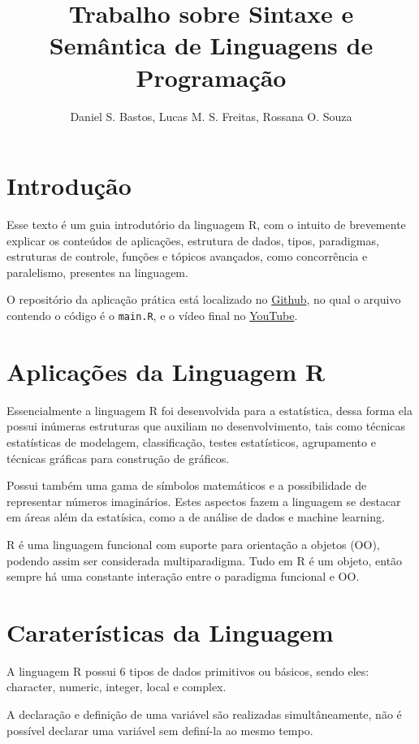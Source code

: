 \documentclass[12pt]{article}
\title{Trabalho sobre Sintaxe e Semântica de Linguagens de Programação}
\author{Daniel S. Bastos\inst{1}, Lucas M. S. Freitas\inst{1}, Rossana O. Souza \inst{1} }
\begin{document}
 

\maketitle

\section{Introdução}

Esse texto é um guia introdutório da linguagem R, com o intuito de brevemente explicar os conteúdos de aplicações, estrutura de dados, tipos, paradigmas, estruturas de controle, funções e tópicos avançados, como concorrência e paralelismo, presentes na linguagem.

O repositório da aplicação prática está localizado no \href{https://github.com/danielSbastos/puc-lpg-trabalho-1}{Github}, no qual o arquivo contendo o código é o \texttt{main.R}, e o vídeo final no \href{https://youtu.be/iBmmmesPYok}{YouTube}.

\section{Aplicações da Linguagem R} \label{sec:Aplicações da Linguagem R}
Essencialmente a linguagem R foi desenvolvida para a estatística, dessa forma ela possui inúmeras estruturas que auxiliam no desenvolvimento, tais como técnicas estatísticas de modelagem, classificação, testes estatísticos, agrupamento e técnicas gráficas para construção de gráficos.

Possui também uma gama de símbolos matemáticos e a possibilidade de representar números imaginários. Estes aspectos fazem a linguagem se destacar em áreas além da estatísica, como a de análise de dados e machine learning.

R é uma linguagem funcional com suporte para orientação a objetos (OO), podendo assim ser considerada multiparadigma. Tudo em R é um objeto, então sempre há uma constante interação entre o paradigma funcional e OO.

\section{Caraterísticas da Linguagem} \label{sec:Caraterísticas da Linguagem}
A linguagem R possui 6 tipos de dados primitivos ou básicos, sendo eles: character, numeric, integer, local e complex.

A declaração e definição de uma variável são realizadas simultâneamente, não é possível declarar uma variável sem definí-la ao mesmo tempo.
\end{document}
